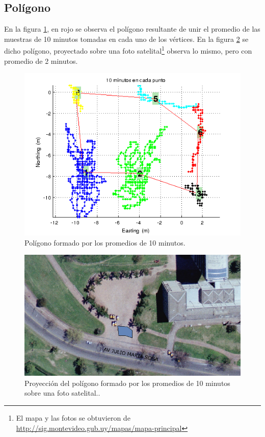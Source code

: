 \documentclass[spanish,12pt,a4paper,titlepage]{report}
\begin{document}
\newpage
\subsection{Polígono}
\label{sec:gps2-poligono}

En la figura \ref{fig:10min_pol.png}, en rojo se observa el polígono resultante de unir el promedio de las muestras de 10 minutos tomadas en cada uno de los vértices. En la figura \ref{fig:10m_mapa.png} se dicho polígono, proyectado sobre una foto satelital\footnote{El mapa y las fotos se obtuvieron de \url{http://sig.montevideo.gub.uy/mapas/mapa-principal}} observa lo mismo, pero con promedio de 2 minutos.

\begin{figure}[h!]
  \centering
  \includegraphics[width=.8\textwidth]{./img/10min_pol.png}
  \caption{Polígono formado por los promedios de 10 minutos.}
  \label{fig:10min_pol.png}
\end{figure}

\begin{figure}[h!]
  \centering
  \includegraphics[width=.8\textwidth]{./img/10m_mapa.png}
  \caption{Proyección del polígono formado por los promedios de 10 minutos sobre una foto satelital..}
  \label{fig:10m_mapa.png}
\end{figure}
\end{document}
